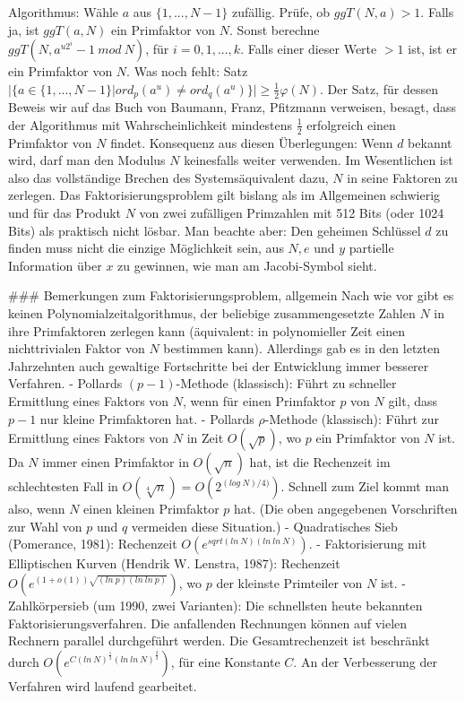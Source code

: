 \documentclass[a4paper]{article}
\begin{document}
\begin{multicols}{3}
{{{{Algorithmus: Wähle $a$ aus $\{1,... ,N-1\}$ zufällig. Prüfe, ob $ggT(N, a)>1$. Falls ja, ist $ggT(a, N)$ ein Primfaktor von $N$. Sonst berechne $ggT(N, a^{u 2^i}-1\ mod\ N)$, für $i=0,1,... , k$. Falls einer dieser Werte $>1$ ist, ist er ein Primfaktor von $N$. Was noch fehlt: Satz $|\{a\in\{1,...,N-1\}|ord_p(a^u)\not= ord_q(a^u)\}|\geq\frac{1}{2}\varphi(N)$. Der Satz, für dessen Beweis wir auf das Buch von Baumann, Franz, Pfitzmann verweisen, besagt, dass der Algorithmus mit Wahrscheinlichkeit mindestens $\frac{1}{2}$ erfolgreich einen Primfaktor von $N$ findet.
Konsequenz aus diesen Überlegungen: Wenn $d$ bekannt wird, darf man den Modulus $N$ keinesfalls weiter verwenden.
Im Wesentlichen ist also das vollständige Brechen des Systemsäquivalent dazu, $N$ in seine Faktoren zu zerlegen. Das Faktorisierungsproblem gilt bislang als im Allgemeinen schwierig und für das Produkt $N$ von zwei zufälligen Primzahlen mit 512 Bits (oder 1024 Bits) als praktisch nicht lösbar.
Man beachte aber: Den geheimen Schlüssel $d$ zu finden muss nicht die einzige Möglichkeit sein, aus $N,e$ und $y$ partielle Information über $x$ zu gewinnen, wie man am Jacobi-Symbol sieht.

### Bemerkungen zum Faktorisierungsproblem, allgemein
Nach wie vor gibt es keinen Polynomialzeitalgorithmus, der beliebige zusammengesetzte Zahlen $N$ in ihre Primfaktoren zerlegen kann (äquivalent: in polynomieller
Zeit einen nichttrivialen Faktor von $N$ bestimmen kann). Allerdings gab es in den letzten Jahrzehnten auch gewaltige Fortschritte bei der Entwicklung immer besserer Verfahren.
- Pollards $(p-1)$-Methode (klassisch): Führt zu schneller Ermittlung eines Faktors von $N$, wenn für einen Primfaktor $p$ von $N$ gilt, dass $p-1$ nur kleine Primfaktoren hat.
- Pollards $ρ$-Methode (klassisch): Führt zur Ermittlung eines Faktors von $N$ in Zeit $O(\sqrt{p})$, wo $p$ ein Primfaktor von $N$ ist. Da $N$ immer einen Primfaktor in $O(\sqrt{n})$ hat, ist die Rechenzeit im schlechtesten Fall in $O(\sqrt[4]{n}) =O(2^{(log\ N)/ 4)})$. Schnell zum Ziel kommt man also, wenn $N$ einen kleinen Primfaktor $p$ hat. (Die oben angegebenen Vorschriften zur Wahl von $p$ und $q$ vermeiden diese Situation.)
- Quadratisches Sieb (Pomerance, 1981): Rechenzeit $O(e^{sqrt{(ln\ N)(ln\ ln\ N)}})$.
- Faktorisierung mit Elliptischen Kurven (Hendrik W. Lenstra, 1987): Rechenzeit $O(e^{(1+o(1)) \sqrt{(ln\ p)(ln\ ln\ p)}})$, wo $p$ der kleinste Primteiler von $N$ ist.
- Zahlkörpersieb (um 1990, zwei Varianten): Die schnellsten heute bekannten Faktorisierungsverfahren. Die anfallenden Rechnungen können auf vielen Rechnern parallel durchgeführt werden. Die Gesamtrechenzeit ist beschränkt durch $O(e^{C(ln\ N)^{\frac{1}{3}} (ln\ ln\ N)^{\frac{2}{3}}})$, für eine Konstante $C$. An der Verbesserung der Verfahren wird laufend gearbeitet.

}}}}
\end{multicols}
\end{document}
